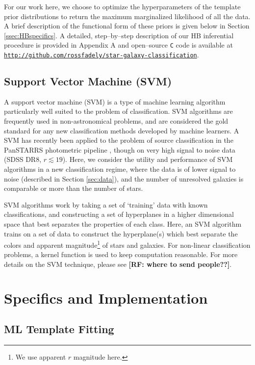 \documentclass[12pt,preprint]{aastex}
\newcommand\rf[1]{{\bf [RF: #1]}}
\begin{document}
For our work here, we choose to optimize the hyperparameters of the template 
prior distributions to return the maximum marginalized likelihood of all the data.  A brief 
description of the functional form of these priors is given below in Section 
\ref{ssec:HBspecifics}.  A detailed, step--by--step description of our HB inferential procedure 
is provided in Appendix A and open--source \texttt{C} code is available at 
{\footnotesize \texttt{\url{http://github.com/rossfadely/star-galaxy-classification}}}. 

\subsection{Support Vector Machine (SVM)}
\label{ssec:SVMmethod}

A support vector machine (SVM) is a type of machine learning algorithm particularly 
well suited to the problem of classification.  SVM algorithms are frequently used in 
non-astronomical problems, and are considered the gold standard for any new 
classification methods developed by machine learners.  A SVM has recently been 
applied to the problem of source classification in the PanSTARRS photometric pipeline 
\citep{saglia12}, though on very high signal to noise data (SDSS DR8, $r\lesssim19$).  Here, 
we consider the utility and performance of SVM algorithms in a new classification regime, 
where the data is of lower signal to noise (described in Section \ref{sec:data}), and the 
number of unresolved galaxies is comparable or more than the number of stars.

SVM algorithms work by taking a set of `training' data with known classifications, and 
constructing a set of hyperplanes in a higher dimensional space that best separates 
the properties of each class.  Here, an SVM algorithm trains on a set of data to construct 
the hyperplane(s) which best separate the colors and apparent magnitude\footnote{We use 
apparent $r$ magnitude here.} of stars and galaxies.  For non-linear classification problems, 
a kernel function is used to keep computation reasonable.  For more details on the 
SVM technique, please see \rf{where to send people??}.

\section{Specifics and Implementation}
\label{sec:specifics}

\subsection{ML Template Fitting}
\label{ssec:MLspecifics}
\end{document}
